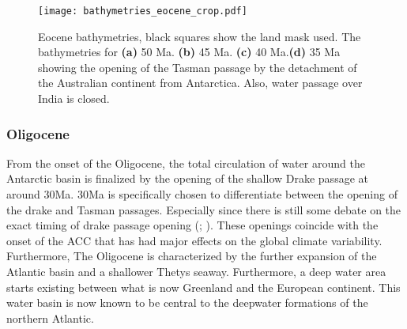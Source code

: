 \begin{figure}[H]
	\texttt{[image: bathymetries\_eocene\_crop.pdf]}
	\caption{Eocene bathymetries, black squares show the land mask used. The bathymetries for \textbf{(a)} 50 Ma. \textbf{(b)} 45 Ma. \textbf{(c)} 40 Ma.\textbf{(d)} 35 Ma showing the opening of the Tasman passage by the detachment of the Australian continent from Antarctica. Also, water passage over India is closed.}
\end{figure}

\begin{multicols}{2}


\subsubsection{Oligocene}
From the onset of the Oligocene, the total circulation of water around the Antarctic basin is finalized by the opening of the shallow Drake passage at around 30Ma. 30Ma is specifically chosen to differentiate between the opening of the drake and Tasman passages. Especially since there is still some debate on the exact timing of drake passage opening (\cite{Scher2006Apr}; \cite{Livermore2005Jul}). These openings coincide with the onset of the ACC that has had major effects on the global climate variability. Furthermore, The Oligocene is characterized by the further expansion of the Atlantic basin and a shallower Thetys seaway. Furthermore, a deep water area starts existing between what is now Greenland and the European continent. This water basin is now known to be central to the deepwater formations of the northern Atlantic.
\end{multicols}

